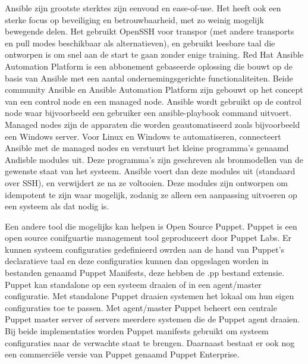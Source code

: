 Ansible zijn grootste sterktes zijn eenvoud en ease-of-use. Het heeft ook een sterke focus op beveiliging en betrouwbaarheid, met zo weinig mogelijk bewegende delen. Het gebruikt OpenSSH voor transpor (met andere transports en pull modes beschikbaar als alternatieven), en gebruikt leesbare taal die ontworpen is om snel aan de start te gaan zonder enige training.
Red Hat Ansible Automation Platform is een abbonement gebaseerde oplossing die bouwt op de basis van Ansible met een aantal ondernemingsgerichte functionaliteiten.
Beide community Ansible en Ansible Automation Platform zijn gebouwt op het concept van een control node en een managed node. Ansible wordt gebruikt op de control node waar bijvoorbeeld een gebruiker een ansible-playbook command uitvoert. Managed nodes zijn de apparaten die worden geautomatiseerd zoals bijvoorbeeld een Windows server.
Voor Linux en Windows te automatiseren, connecteert Ansible met de managed nodes en verstuurt het kleine programma's genaamd Andisble modules uit. Deze programma's zijn geschreven als bronmodellen van de gewenste staat van het systeem. Ansible voert dan deze modules uit (standaard over SSH), en verwijdert ze na ze voltooien.
Deze modules zijn ontworpen om idempotent te zijn waar mogelijk, zodanig ze alleen een aanpassing uitvoeren op een systeem als dat nodig is. \autocite{AnisbleHow} \break

Een andere tool die mogelijks kan helpen is Open Source Puppet.
Puppet is een open source conifguartie management tool geproduceert door Puppet Labs. Er kunnen systeem configuraties gedefinieerd owrden aan de hand van Puppet's declaratieve taal en deze configuraties kunnen dan opgeslagen worden in bestanden genaamd Puppet Manifests, deze hebben de .pp bestand extensie.
Puppet kan standalone op een systeem draaien of in een agent/master configuratie. Met standalone Puppet draaien systemen het lokaal om hun eigen configuraties toe te passen. Met agent/master Puppet beheert een centrale Puppet master server of servers meerdere systemen die de Puppet agent draaien.
Bij beide implementaties worden Puppet manifests gebruikt om systeem configuraties naar de verwachte staat te brengen. Daarnaast bestaat er ook nog een commerciële versie van Puppet genaamd Puppet Enterprise. \autocite{Puppet} \break

